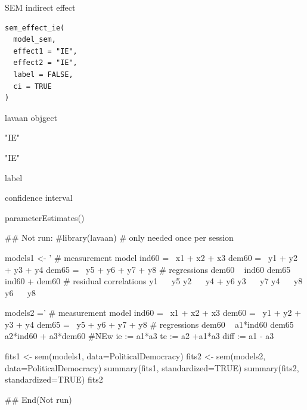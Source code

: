 \documentclass[a4paper]{book}
\begin{document}
%
\begin{Description}
SEM indirect effect
\end{Description}
%
\begin{Usage}
\begin{verbatim}
sem_effect_ie(
  model_sem,
  effect1 = "IE",
  effect2 = "IE",
  label = FALSE,
  ci = TRUE
)
\end{verbatim}
\end{Usage}
%
\begin{Arguments}
\begin{ldescription}
\item[\code{model\_sem}] lavaan objgect

\item[\code{effect1}] "IE"

\item[\code{effect2}] "IE"

\item[\code{label}] label

\item[\code{ci}] confidence interval
\end{ldescription}
\end{Arguments}
%
\begin{Value}
parameterEstimates()
\end{Value}
%
\begin{Examples}
\begin{ExampleCode}

\#\# Not run: 
#library(lavaan) # only needed once per session

models1 <- '
  # measurement model
    ind60 =~ x1 + x2 + x3
    dem60 =~ y1 + y2 + y3 + y4
    dem65 =~ y5 + y6 + y7 + y8
    # regressions
    dem60 ~ ind60
    dem65 ~ ind60 + dem60
      # residual correlations
    y1 ~~ y5
    y2 ~~ y4 + y6
    y3 ~~ y7
    y4 ~~ y8
    y6 ~~ y8

models2 ='
  # measurement model
    ind60 =~ x1 + x2 + x3
    dem60 =~ y1 + y2 + y3 + y4
    dem65 =~ y5 + y6 + y7 + y8
     # regressions
    dem60 ~ a1*ind60
    dem65 ~ a2*ind60 + a3*dem60
 #NEw
   ie := a1*a3
   te := a2 +a1*a3
   diff := a1 - a3




fits1 <- sem(models1, data=PoliticalDemocracy)
fits2 <- sem(models2, data=PoliticalDemocracy)
summary(fits1, standardized=TRUE)
summary(fits2, standardized=TRUE)
fits2 %

## End(Not run)

\end{ExampleCode}
\end{Examples}
\end{document}
